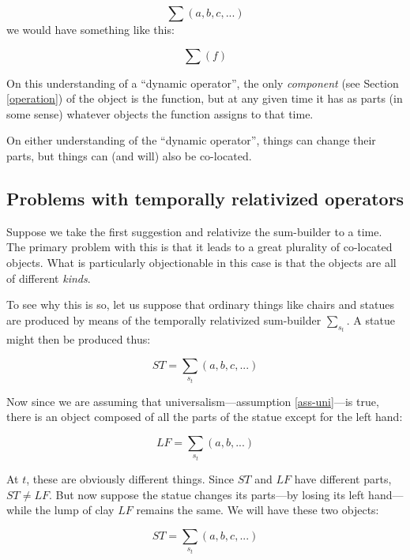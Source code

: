 \documentclass[12pt,twoside]{reedfancy}
\begin{document}
\begin{spacing}{1.25}
\begin{displaymath}
\sum (a, b, c, ... )
\end{displaymath}
we would have something like this:

\begin{displaymath}
\sum ( f )
\end{displaymath}

On this understanding of a ``dynamic operator'', the only {\em
  component} (see Section \ref{operation}) of the object is the
function, but at any given time it has as parts (in some sense)
whatever objects the function assigns to that time.

On either understanding of the ``dynamic operator'', things can change
their parts, but things can (and will) also be co-located.

\subsection{Problems with temporally relativized operators}
\label{problems2a}
Suppose we take the first suggestion and relativize the sum-builder to
a time.  The primary problem with this is that it leads to a great
plurality of co-located objects.  What is particularly objectionable
in this case is that the objects are all of different {\em kinds}.

To see why this is so, let us suppose that ordinary things like chairs
and statues are produced by means of the temporally relativized
sum-builder $\sum_{s_t}$.  A statue might then be produced thus:

\begin{displaymath}
ST = \sum_{s_t} (a, b, c, ... )
\end{displaymath}

Now since we are assuming that universalism---assumption
\ref{ass-uni}---is true, there is an object composed of all the parts
of the statue except for the left hand:

\begin{displaymath}
LF = \sum_{s_t} (a, b, ... )
\end{displaymath}

At $t$, these are obviously different things.  Since $ST$ and $LF$
have different parts, $ST \neq LF$.  But now suppose the statue
changes its parts---by losing its left hand---while the lump of clay
$LF$ remains the same.  We will have these two objects:

\begin{displaymath}
ST = \sum_{s_t} (a, b, c, ... )
\end{displaymath}


\end{spacing}
\end{document}
